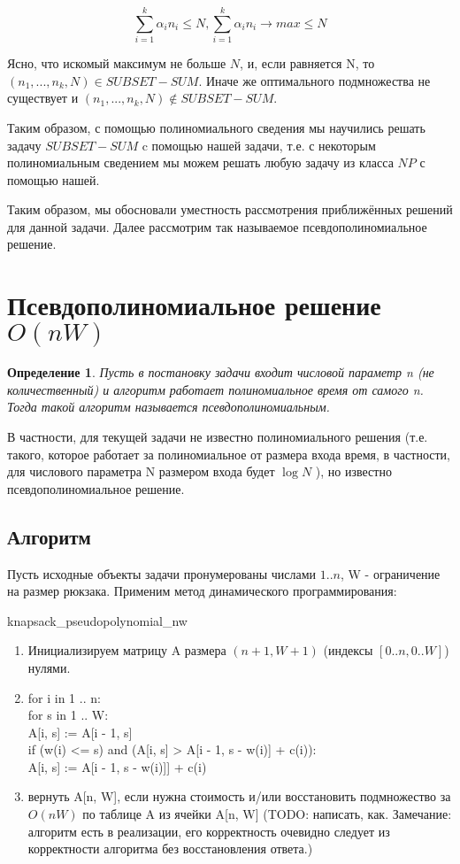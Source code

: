 \documentclass{article}
\newtheorem{definition}{Определение} %
\begin{document}
$$\sum\limits_{i = 1}^{k} {\alpha_i n_i} \leq N, \sum\limits_{i = 1}^{k} {\alpha_i n_i} \rightarrow max \leq N$$ 

Ясно, что искомый максимум не больше $N$, и, если равняется N, то $(n_1 , . . . , n_k , N ) \in SUBSET-SUM$. Иначе же оптимального подмножества не существует и $(n_1 , . . . , n_k , N ) \not\in SUBSET-SUM$.

Таким образом, с помощью полиномиального сведения мы научились решать задачу $SUBSET-SUM$ c помощью нашей задачи, т.е. с некоторым полиномиальным сведением мы можем решать любую задачу из класса $NP$ с помощью нашей.

Таким образом, мы обосновали уместность рассмотрения приближённых решений для данной задачи. Далее рассмотрим так называемое псевдополиномиальное решение. 


\section{Псевдополиномиальное решение $O(nW)$}

	\begin{definition}
		Пусть в постановку задачи входит числовой параметр n (не количественный) и алгоритм работает полиномиальное время от самого n. Тогда такой алгоритм называется псевдополиномиальным.
	\end{definition}
	В частности, для текущей задачи не известно полиномиального решения (т.е. такого, которое работает за полиномиальное от размера входа время, в частности, для числового параметра N размером входа будет $\log{N}$ ), но известно псевдополиномиальное решение.
	
	\subsection{Алгоритм}
	
	Пусть исходные объекты задачи пронумерованы числами $1..n$, W - ограничение на размер рюкзака. Применим метод динамического программирования:
	
	knapsack\_pseudopolynomial\_nw
\begin{enumerate}
	\item Инициализируем матрицу A размера $(n + 1, W + 1)$ (индексы $[0..n, 0..W]$) нулями.
	\item for i in 1 .. n: \\
		for s in 1 .. W: \\
		A[i, s] := A[i - 1, s] \\
		if (w(i) <= s) and (A[i, s] > A[i - 1, s - w(i)] + c(i)): \\
			A[i, s] := A[i - 1, s - w(i)]] + c(i)
	\item вернуть A[n, W], если нужна стоимость и/или восстановить подмножество за $O(nW)$ по таблице A из ячейки A[n, W] (TODO: написать, как. Замечание: алгоритм есть в реализации, его корректность очевидно следует из корректности алгоритма без восстановления ответа.)
	

\end{enumerate}
	
\end{document}
